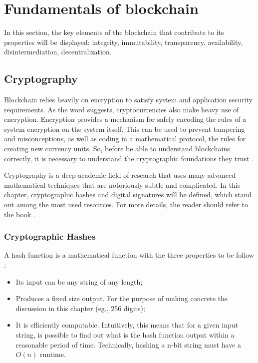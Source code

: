 \section{Fundamentals of blockchain}\label{sec:fundamentals}
In this section, the key elements of the blockchain that contribute to its properties will be displayed: integrity, immutability, transparency, availability, disintermediation, decentralization.

\subsection{Cryptography}\label{sec:criptografia}
Blockchain relies heavily on encryption to satisfy system and application security requirements. As the word suggests, cryptocurrencies also make heavy use of encryption. Encryption provides a mechanism for safely encoding the rules of a system encryption on the system itself. This can be used to prevent tampering and misconceptions, as well as coding in a mathematical protocol, the rules for creating new currency units. So, before be able to understand blockchains correctly, it is necessary to understand the cryptographic foundations they trust \cite{narayanan2016bitcoin}.

Cryptography is a deep academic field of research that uses many advanced mathematical techniques that are notoriously subtle and complicated. In this chapter, cryptographic hashes and digital signatures will be defined, which stand out among the most used resources. For more details, the reader should refer to the book \cite{narayanan2016bitcoin}.

\subsubsection{Cryptographic Hashes}\label{sec:hashesCriptograficos}
A hash function is a mathematical function with the three properties to be follow \cite{narayanan2016bitcoin}:

\begin{itemize}
\item  Its input can be any string of any length;
\item Produces a fixed size output. For the purpose of making concrete
the discussion in this chapter (eg., 256 digits);
\item It is efficiently computable. Intuitively, this means that for
a given input string, is possible to find out what is the hash function output within a reasonable period of time. Technically, hashing a n-bit string must have a $O(n)$ runtime.
\end{itemize}

